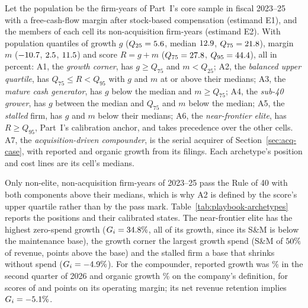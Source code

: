 \begin{definition}[Archetypes]\label{def:playbook-archetypes}
Let the population be the \pbCutNpop{} firm-years of Part~I's core sample in fiscal 2023--25 with a free-cash-flow margin after stock-based compensation (estimand E1), and the members of each cell its \pbCutNEtwo{} non-acquisition firm-years (estimand E2). With population quantiles of growth $g$ ($Q_{25}=5.6$, median $12.9$, $Q_{75}=21.8$), margin $m$ ($-10.7$, $2.5$, $11.5$) and score $R=g+m$ ($Q_{75}=27.8$, $Q_{95}=44.4$), all in percent: A1, the \emph{growth corner}, has $g\ge Q_{75}$ and $m<Q_{25}$; A2, the \emph{balanced upper quartile}, has $Q_{75}\le R<Q_{95}$ with $g$ and $m$ at or above their medians; A3, the \emph{mature cash generator}, has $g$ below the median and $m\ge Q_{75}$; A4, the \emph{sub-40 grower}, has $g$ between the median and $Q_{75}$ and $m$ below the median; A5, the \emph{stalled} firm, has $g$ and $m$ below their medians; A6, the \emph{near-frontier elite}, has $R\ge Q_{95}$, Part~I's calibration anchor, and takes precedence over the other cells. A7, the \emph{acquisition-driven compounder}, is the serial acquirer of Section~\ref{sec:acq-case}, with reported and organic growth from its filings. Each archetype's position and cost lines are its cell's medians.
\end{definition}

Only \pbCutNpassforty{} non-elite, non-acquisition firm-years of 2023--25 pass the Rule of 40 with both components above their medians, which is why A2 is defined by the score's upper quartile rather than by the pass mark. Table~\ref{tab:playbook-archetypes} reports the positions and their calibrated states. The near-frontier elite has the highest zero-spend growth ($G_i=34.8\%$, all of its growth, since its S\&M is below the maintenance base), the growth corner the largest growth spend (S\&M of $50\%$ of revenue, \pbAOneSigma{} points above the base) and the stalled firm a base that shrinks without spend ($G_i=-4.9\%$). For the compounder, reported growth was \pbASevenGrep\% in the second quarter of 2026 and organic growth \pbASevenGorg\% on the company's definition, for scores of \pbASevenRrep{} and \pbASevenRorg{} points on its operating margin; its net revenue retention implies $G_i=-5.1\%$.


